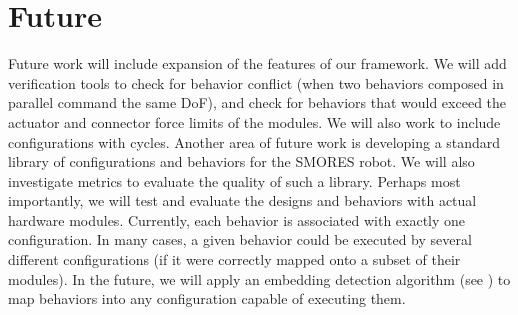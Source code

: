 \documentclass[graybox]{svmult}
\begin{document}
\section{Future}
Future work will include expansion of the features of our framework.  We will add verification tools to check for behavior conflict (when two behaviors composed in parallel command the same DoF), and check for behaviors that would exceed the actuator and connector force limits of the modules.  We will also work to include configurations with cycles.
Another area of future work is developing a standard library of configurations and
behaviors for the SMORES robot.  We will also investigate metrics to evaluate the quality of such a library.
Perhaps most importantly, we will test and evaluate the designs and behaviors with actual hardware modules.
Currently, each behavior is associated with exactly one configuration. In many cases, a given behavior could be executed by several different configurations (if it were correctly mapped onto a subset of their modules). In the future, we will apply an embedding detection algorithm (see \cite{mantzouratos2014embeddability}) to map behaviors into any configuration capable of executing them.

%
%


\end{document}
